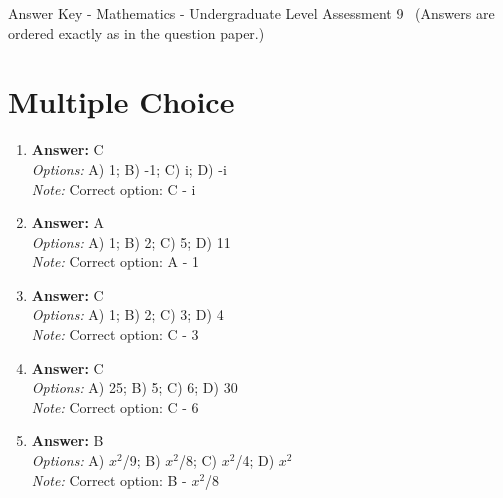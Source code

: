 \documentclass[12pt]{article}
\begin{document}
\begin{center}
Answer Key - Mathematics - Undergraduate Level Assessment 9 \
\small (Answers are ordered exactly as in the question paper.)
\end{center}

\section*{Multiple Choice}
\begin{enumerate}[label=\arabic*.]
\item \textbf{Answer:} C
\\ \textit{Options:} A) 1; B) -1; C) i; D) -i
\\ \textit{Note:} Correct option: C - i
\item \textbf{Answer:} A
\\ \textit{Options:} A) 1; B) 2; C) 5; D) 11
\\ \textit{Note:} Correct option: A - 1
\item \textbf{Answer:} C
\\ \textit{Options:} A) 1; B) 2; C) 3; D) 4
\\ \textit{Note:} Correct option: C - 3
\item \textbf{Answer:} C
\\ \textit{Options:} A) 25; B) 5; C) 6; D) 30
\\ \textit{Note:} Correct option: C - 6
\item \textbf{Answer:} B
\\ \textit{Options:} A) $x^2$/9; B) $x^2$/8; C) $x^2$/4; D) $x^2$
\\ \textit{Note:} Correct option: B - $x^2$/8
\end{enumerate}
\end{document}
